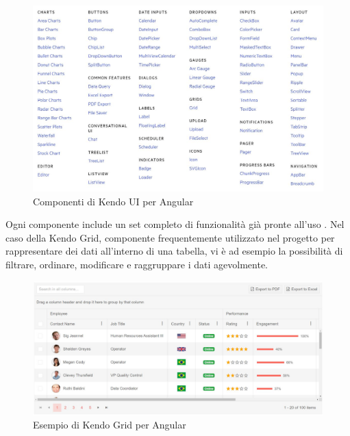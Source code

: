 \begin{figure}[h!]
\begin{center}
  \includegraphics[width=15cm]{images/kendo_components.JPG}
  \caption{Componenti di Kendo UI per Angular}
\end{center}
\end{figure}
\pagebreak
Ogni componente include un set completo di funzionalità già pronte all'uso \cite{KENDO}. Nel caso della Kendo Grid, componente frequentemente utilizzato nel progetto per rappresentare dei dati all'interno di una tabella, vi è ad esempio la possibilità di filtrare, ordinare, modificare e raggruppare i dati agevolmente.
\begin{figure}[ht!]
\begin{center}
  \includegraphics[width=14cm]{images/kendo_grid.JPG}
  \caption{Esempio di Kendo Grid per Angular}
\end{center}
\end{figure}

\pagebreak
